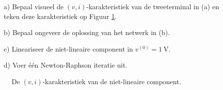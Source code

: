 \documentclass{kuburgiearticle}
\begin{document}
	\begin{enumerate}
		\item[a)] Bepaal visueel de \((v,i)\)-karakteristiek van de tweeterminal in (a) en teken deze karakteristiek op Figuur \ref{fig:nietlineair}.
		\item[b)] Bepaal ongeveer de oplossing van het netwerk in (b).
		\item[c)] Lineariseer de niet-lineaire component in \(v^{(0)}=\SI{1}{\volt}\).
		\item[d)] Voer één Newton-Raphson iteratie uit.
	\end{enumerate}

	\vspace{1cm}

	\begin{figure}[h!]
		\centering
		\caption{De \((v,i)\)-karakteristiek van de niet-lineaire component.}
		\label{fig:nietlineair}
	\end{figure}
\end{document}
